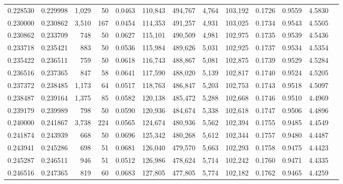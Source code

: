 \begin{tabular}{rrrrrrrrrrrrr}
0.228530 & 0.229998 & 1,029 &  50 &                                     0.0463 & 110,843 & 494,767 &   4,764 & 103,192 & 0.1726 & 0.9559 & 4.5830 \\
0.230000 & 0.230862 & 3,510 & 167 &                                     0.0454 & 114,353 & 491,257 &   4,931 & 103,025 & 0.1734 & 0.9543 & 4.5505 \\
0.230862 & 0.233709 &   748 &  50 &                                     0.0627 & 115,101 & 490,509 &   4,981 & 102,975 & 0.1735 & 0.9539 & 4.5436 \\
0.233718 & 0.235421 &   883 &  50 &                                     0.0536 & 115,984 & 489,626 &   5,031 & 102,925 & 0.1737 & 0.9534 & 4.5354 \\
0.235422 & 0.236511 &   759 &  50 &                                     0.0618 & 116,743 & 488,867 &   5,081 & 102,875 & 0.1739 & 0.9529 & 4.5284 \\
0.236516 & 0.237365 &   847 &  58 &                                     0.0641 & 117,590 & 488,020 &   5,139 & 102,817 & 0.1740 & 0.9524 & 4.5205 \\
0.237372 & 0.238485 & 1,173 &  64 &                                     0.0517 & 118,763 & 486,847 &   5,203 & 102,753 & 0.1743 & 0.9518 & 4.5097 \\
0.238487 & 0.239164 & 1,375 &  85 &                                     0.0582 & 120,138 & 485,472 &   5,288 & 102,668 & 0.1746 & 0.9510 & 4.4969 \\
0.239179 & 0.239989 &   798 &  50 &                                     0.0590 & 120,936 & 484,674 &   5,338 & 102,618 & 0.1747 & 0.9506 & 4.4896 \\
0.240000 & 0.241867 & 3,738 & 224 &                                     0.0565 & 124,674 & 480,936 &   5,562 & 102,394 & 0.1755 & 0.9485 & 4.4549 \\
0.241874 & 0.243939 &   668 &  50 &                                     0.0696 & 125,342 & 480,268 &   5,612 & 102,344 & 0.1757 & 0.9480 & 4.4487 \\
0.243941 & 0.245286 &   698 &  51 &                                     0.0681 & 126,040 & 479,570 &   5,663 & 102,293 & 0.1758 & 0.9475 & 4.4423 \\
0.245287 & 0.246511 &   946 &  51 &                                     0.0512 & 126,986 & 478,624 &   5,714 & 102,242 & 0.1760 & 0.9471 & 4.4335 \\
0.246516 & 0.247365 &   819 &  60 &                                     0.0683 & 127,805 & 477,805 &   5,774 & 102,182 & 0.1762 & 0.9465 & 4.4259 \\

\end{tabular}
